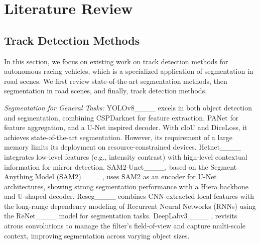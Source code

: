 \section{Literature Review}
\subsection{Track Detection Methods }
In this section, we focus on existing work on track detection methods for autonomous racing vehicles, which is a specialized application of segmentation in road scenes. We first review state-of-the-art segmentation methods, then segmentation in road scenes, and finally, track detection methods. 




\textit{Segmentation for General Tasks:} YOLOv8____ excels in both object detection and segmentation, combining CSPDarknet for feature extraction, PANet for feature aggregation, and a U-Net inspired decoder. With cIoU and DiceLoss, it achieves state-of-the-art segmentation. However, its  requirement of a large memory limits its deployment on resource-constrained devices. Hetnet____ integrates low-level features (e.g., intensity contrast) with high-level contextual information for mirror detection. SAM2-Unet____, based on the Segment Anything Model (SAM2)____, uses SAM2 as an encoder for U-Net architectures, showing strong segmentation performance with a Hiera backbone and U-shaped decoder. Reseg____ combines CNN-extracted local features with the long-range dependency modeling of Recurrent Neural Networks (RNNs) using the ReNet____ model for segmentation tasks. DeepLabv3____%
, revisits atrous convolutions to manage the filter’s field-of-view and capture multi-scale context, improving segmentation across varying object sizes.

